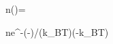\overline n(\varepsilon)=

\overline n\simeq e^{-(\varepsilon-\mu)/(k_BT)}\quad(\varepsilon-\mu\gg k_BT)
